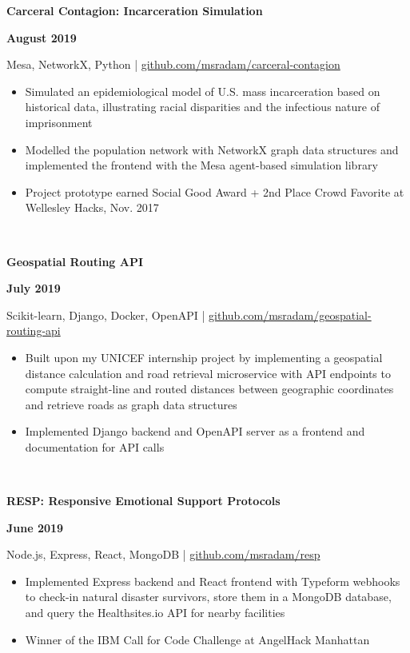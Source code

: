 \documentclass[letterpaper, 11pt]{article}
\newcommand{\projectentry}[4]{

    \begin{minipage}[b]{0.5\textwidth}
        \raggedright
        \bf #2
        \end{minipage}%
        \begin{minipage}[b]{0.5\textwidth}
        \raggedleft
        \bf #1
        \end{minipage}

    \begin{minipage}[t]{\linewidth}
    \vspace{-3mm}
    \small #3
    \vspace{-1.75mm}
    \small{#4}
    \end{minipage}\\
    \vspace{1mm}
    }
\begin{document}
        \projectentry{August 2019}
        {Carceral Contagion: Incarceration Simulation}
        {Mesa, NetworkX, Python | \href{https://github.com/msradam/carceral-contagion}{github.com/msradam/carceral-contagion}}
        {\begin{itemize}
            \setlength\itemsep{-0.5mm}
            \item Simulated an epidemiological model of U.S. mass incarceration based on historical data, illustrating racial disparities and the infectious nature of imprisonment
            \item Modelled the population network with NetworkX graph data structures and implemented the frontend with the Mesa agent-based simulation library
            \item Project prototype earned Social Good Award + 2nd Place Crowd Favorite at Wellesley Hacks, Nov. 2017
        \end{itemize}
        }

        \projectentry{July 2019}
        {Geospatial Routing API}
        {Scikit-learn, Django, Docker, OpenAPI | \href{https://github.com/msradam/geospatial-routing-api}{github.com/msradam/geospatial-routing-api}}
        {\begin{itemize}
            \setlength\itemsep{-0.5mm}
            \item Built upon my UNICEF internship project by implementing a geospatial distance calculation and road retrieval microservice with API endpoints to compute straight-line and routed distances between geographic coordinates and retrieve roads as graph data structures
            \item Implemented Django backend and OpenAPI server as a frontend and documentation for API calls
        \end{itemize}
        }


        \projectentry{June 2019}
            {RESP: Responsive Emotional Support Protocols}
            {Node.js, Express, React, MongoDB | \href{https://github.com/msradam/resp}{github.com/msradam/resp}}
            {\begin{itemize}
                \setlength\itemsep{-0.5mm}
                \item Implemented Express backend and React frontend with Typeform webhooks to check-in natural disaster survivors, store them in a MongoDB database, and query the Healthsites.io API for nearby facilities
                \item Winner of the IBM Call for Code Challenge at AngelHack Manhattan
            \end{itemize}
            }
            
\end{document}
